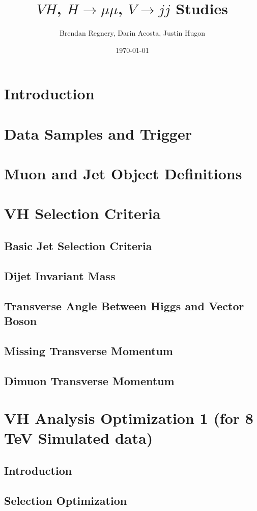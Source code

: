 \documentclass[12pt]{article}
\title{$VH$, $H\rightarrow \mu \mu$, $V\rightarrow jj$ Studies}
\author{Brendan Regnery, Darin Acosta, Justin Hugon}
\date{\today}
\begin{document}
\maketitle
 
\section{Introduction}
\section{Data Samples and Trigger}
\section{Muon and Jet Object Definitions}
\section{VH Selection Criteria}
\subsection{Basic Jet Selection Criteria}
\subsection{Dijet Invariant Mass}
\subsection{Transverse Angle Between Higgs and Vector Boson}
\subsection{Missing Transverse Momentum}
\subsection{Dimuon Transverse Momentum}
\section{VH Analysis Optimization 1 (for 8 TeV Simulated data)}
\subsection{Introduction}
\subsection{Selection Optimization}
\end{document}
